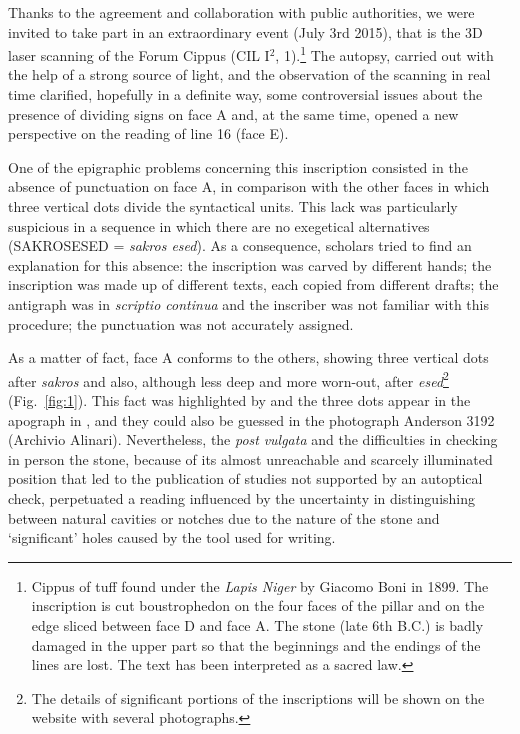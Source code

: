 \documentclass[amsthm,ebook]{saparticle}
\begin{document}
\noindent Thanks to the agreement and collaboration with public authorities, we were invited to take part in an extraordinary
event (July 3rd 2015), that is the 3D laser scanning of the Forum Cippus (CIL I$^2$, 1).\footnote{Cippus of tuff found
under the \emph{Lapis Niger} by Giacomo Boni in 1899. The inscription is cut boustrophedon on the four faces of the pillar and
on the edge sliced between face D and face A. The stone (late 6th B.C.) is badly damaged in the upper part so that the
beginnings and the endings of the lines are lost. The text has been interpreted as a sacred law.} The autopsy, carried
out with the help of a strong source of light, and the observation of the scanning in real time clarified, hopefully in
a definite way, some controversial issues about the presence of dividing signs on face A and, at the same time, opened
a new perspective on the reading of line 16 (face E). 

One of the epigraphic problems concerning this inscription consisted in the absence of punctuation on face A, in
comparison with the other faces in which three vertical dots divide the syntactical units. This lack was particularly
suspicious in a sequence in which there are no exegetical alternatives (SAKROSESED = \emph{sakros esed}). As a consequence,
scholars tried to find an explanation for this absence: the inscription was carved by different hands; the inscription
was made up of different texts, each copied from different drafts; the antigraph was in \emph{scriptio continua} and the
inscriber was not familiar with this procedure; the punctuation was not accurately assigned.

As a matter of fact, face A conforms to the others, showing three vertical dots after \emph{sakros} and also, although less
deep and more worn-out, after \emph{esed}\footnote{The details of significant portions of the inscriptions will be shown on
the website with several photographs. } (Fig.~\ref{fig:1}). This fact was highlighted by \citet{gamurrini_paleografia_1899} and the three dots
appear in the apograph in \citet[col. 1003]{hulsen_neue_1899},  and they could also be guessed in the photograph Anderson 3192
(Archivio Alinari). Nevertheless, the \emph{post} \citet{goidanich_rapporti_1943} \emph{vulgata} and the difficulties in checking in person the
stone, because of its almost unreachable and scarcely illuminated position that led to the publication of studies not
supported by an autoptical check, perpetuated a reading influenced by the uncertainty in distinguishing between natural
cavities or notches due to the nature of the stone and `significant' holes caused by the tool used for writing. 
\end{document}
